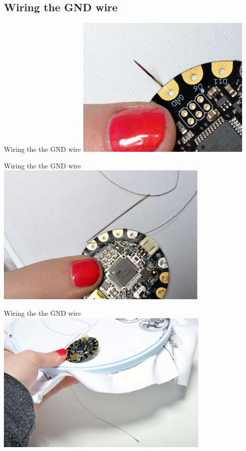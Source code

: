 \documentclass[aspectratio=169]{beamer}
\begin{document}
\subsection{Wiring the GND wire}
\begin{frame}[fragile]{Wiring the the GND wire}
\includegraphics[height=2.75in]{flora_DSC_0099.jpg}
\end{frame}
\begin{frame}[fragile]{Wiring the the GND wire}
\includegraphics[height=2.75in]{flora_DSC_0100.jpg}
\end{frame}
\begin{frame}[fragile]{Wiring the the GND wire}
\includegraphics[height=2.75in]{flora_DSC_0101.jpg}
\end{frame}
\end{document}
